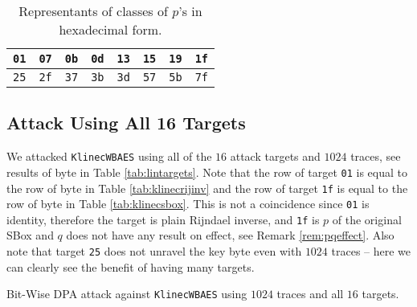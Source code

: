\begin{table}[h]
	\begin{center}
	\begin{tabular}{| c | c | c | c | c | c | c | c |}
		\hline
		{\tt 01} & {\tt 07} & {\tt 0b} & {\tt 0d} & {\tt 13} & {\tt 15} & {\tt 19} & {\tt 1f} \\
		\hline
		{\tt 25} & {\tt 2f} & {\tt 37} & {\tt 3b} & {\tt 3d} & {\tt 57} & {\tt 5b} & {\tt 7f} \\
		\hline
	\end{tabular}
	\end{center}
\caption{Representants of classes of $p$'s in hexadecimal form.}
\label{tab:classrepre}
\end{table}



\subsection{Attack Using All 16 Targets}

We attacked {\tt KlinecWBAES} using all of the $16$ attack targets and $1024$ traces, see results of  byte in Table \ref{tab:lintargets}. Note that the row of target {\tt 01} is equal to the row of  byte in Table \ref{tab:klinecrijinv} and the row of target {\tt 1f} is equal to the row of  byte in Table \ref{tab:klinecsbox}. This is not a coincidence since {\tt 01} is identity, therefore the target is plain Rijndael inverse, and {\tt 1f} is $p$ of the original SBox and $q$ does not have any result on effect, see Remark \ref{rem:pqeffect}. Also note that target {\tt 25} does not unravel the  key byte even with $1024$ traces -- here we can clearly see the benefit of having many targets.

\begin{landscape}
\begin{table}[H]
	\begin{center}
	
	\end{center}
\caption{Bit-Wise DPA attack against {\tt KlinecWBAES} using $1024$ traces and all $16$ targets.}
\label{tab:lintargets}
\end{table}
\end{landscape}


